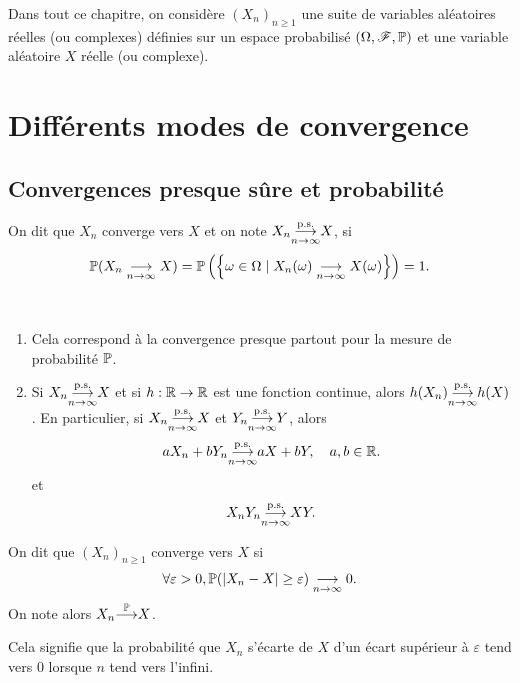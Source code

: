 Dans tout ce chapitre, on considère \({(X_n)}_{n\geq 1}\) 
une suite de variables aléatoires réelles (ou complexes)
définies sur un espace probabilisé \((\Omega, \mathscr{F}, \mathbb{P})\)
et une variable aléatoire \(X\) réelle (ou complexe).

\section{Différents modes de convergence} %

\subsection{Convergences presque sûre et probabilité} %

\begin{definition}
    On dit que \(X_n\) converge  vers
    \(X\) et on note \(X_n \underset{n\to\infty}{{\overset{\text{p.s.}}{\longrightarrow}}} X\),
    si
    \begin{equation*}
        \mathbb{P}(X_n \underset{n\to\infty}{\longrightarrow} X)
        = \mathbb{P}\left(\left\{\omega \in \Omega \mid X_n(\omega) \underset{n\to\infty}{\longrightarrow} X(\omega)\right\}\right)
        = 1.
    \end{equation*}
\end{definition}

\begin{remark}\,
    \begin{enumerate}
        \item Cela correspond à la convergence presque partout pour la
        mesure de probabilité \(\mathbb{P}\).

        \item Si \(X_n \underset{n\to\infty}{{\overset{\text{p.s.}}{\longrightarrow}}} X\)
        et si \(h: \mathbb{R} \to \mathbb{R}\) est une fonction continue, alors
        \(h(X_n) \underset{n\to\infty}{{\overset{\text{p.s.}}{\longrightarrow}}} h(X)\). En particulier, si
        \(X_n \underset{n\to\infty}{{\overset{\text{p.s.}}{\longrightarrow}}} X\) et \(Y_n \underset{n\to\infty}{{\overset{\text{p.s.}}{\longrightarrow}}} Y\), alors
        \begin{equation*}
            aX_n + bY_n \underset{n\to\infty}{{\overset{\text{p.s.}}{\longrightarrow}}} aX + bY,\quad a, b \in \mathbb{R}.
        \end{equation*}
        et
        \begin{equation*}
            X_n Y_n \underset{n\to\infty}{{\overset{\text{p.s.}}{\longrightarrow}}} XY.
        \end{equation*}
    \end{enumerate}
\end{remark}

\begin{definition}
    On dit que \({(X_n)}_{n\geq 1}\) converge  vers
    \(X\) si
    \begin{equation*}
        \forall \varepsilon > 0,\mathbb{P}(\mathopen{}\left|X_n - X\right|\mathclose{} \geq \varepsilon) \underset{n\to\infty}{\longrightarrow} 0.
    \end{equation*}
    On note alors \(X_n {\overset{\mathbb{P}}{\longrightarrow}} X\).

    Cela signifie que la probabilité que \(X_n\) s'écarte de \(X\)
    d'un écart supérieur à \(\varepsilon\) tend vers 0 lorsque
    \(n\) tend vers l'infini.
\end{definition}

